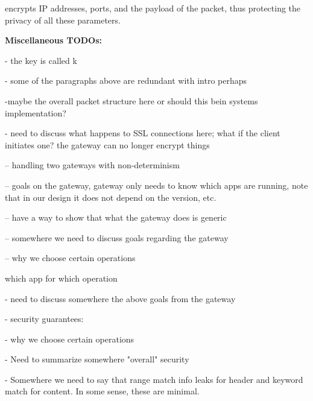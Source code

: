 \sys encrypts IP addresses, ports, and the payload of the packet, thus protecting the privacy of all these parameters. 


{\bf Miscellaneous TODOs:}

- the key is called k

- some of the paragraphs above are redundant with intro perhaps

-maybe the overall packet structure here or should this bein systems implementation? 

- need to discuss what happens to SSL connections here; what if the client initiates one? the gateway can no longer
encrypt things

-- handling two gateways with non-determinism

-- goals on the gateway, gateway only needs to know which apps are running, note that in our design
it does not depend on the version, etc. 

-- have a way to show that what the gateway does is generic 
   
-- somewhere we need to discuss goals regarding the gateway

-- why we choose certain operations

which app for which operation


- need to discuss somewhere the above goals from the gateway

- security guarantees:

- why we choose certain operations

- Need to summarize somewhere "overall" security

- Somewhere we need to say that range match info leaks for header and keyword match for content. In some sense, these are minimal. 


